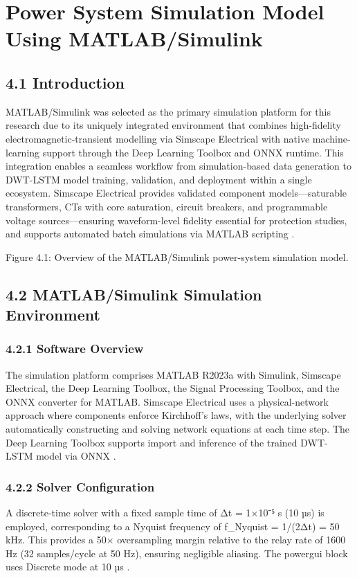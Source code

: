\chapter{Power System Simulation Model Using MATLAB/Simulink}
\label{ch:chapter4}


\section{4.1  Introduction}
MATLAB/Simulink was selected as the primary simulation platform for this research due to its uniquely integrated environment that combines high-fidelity electromagnetic-transient modelling via Simscape Electrical with native machine-learning support through the Deep Learning Toolbox and ONNX runtime. This integration enables a seamless workflow from simulation-based data generation to DWT-LSTM model training, validation, and deployment within a single ecosystem. Simscape Electrical provides validated component models---saturable transformers, CTs with core saturation, circuit breakers, and programmable voltage sources---ensuring waveform-level fidelity essential for protection studies, and supports automated batch simulations via MATLAB scripting \cite{ref1, ref2}.

Figure 4.1: Overview of the MATLAB/Simulink power-system simulation model.


\section{4.2  MATLAB/Simulink Simulation Environment}

\subsection{4.2.1  Software Overview}
The simulation platform comprises MATLAB R2023a with Simulink, Simscape Electrical, the Deep Learning Toolbox, the Signal Processing Toolbox, and the ONNX converter for MATLAB. Simscape Electrical uses a physical-network approach where components enforce Kirchhoff's laws, with the underlying solver automatically constructing and solving network equations at each time step. The Deep Learning Toolbox supports import and inference of the trained DWT-LSTM model via ONNX \cite{ref3}.


\subsection{4.2.2  Solver Configuration}
A discrete-time solver with a fixed sample time of Δt = 1×10⁻⁵ s (10 µs) is employed, corresponding to a Nyquist frequency of f\_Nyquist = 1/(2Δt) = 50 kHz. This provides a 50× oversampling margin relative to the relay rate of 1600 Hz (32 samples/cycle at 50 Hz), ensuring negligible aliasing. The powergui block uses Discrete mode at 10 µs \cite{ref4}.


